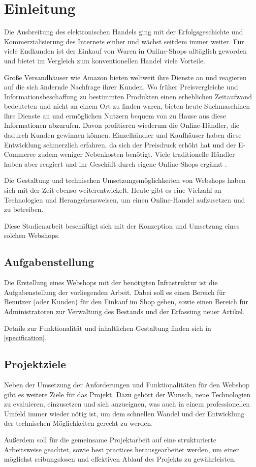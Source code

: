 \section{Einleitung} \thispagestyle{nomarkstyle}
Die Ausbreitung des elektronischen Handels ging mit der Erfolgsgeschichte und Kommerzialisierung des Internets einher und wächst seitdem immer weiter.
Für viele Endkunden ist der Einkauf von Waren in Online-Shops alltäglich geworden und bietet im Vergleich zum konventionellen Handel viele Vorteile.

Große Versandhäuser wie Amazon bieten weltweit ihre Dienste an und reagieren auf die sich ändernde Nachfrage ihrer Kunden.
Wo früher Preisvergleiche und Informationsbeschaffung zu bestimmten Produkten einen erheblichen Zeitaufwand bedeuteten und nicht an einem Ort zu finden waren, bieten heute Suchmaschinen ihre Dienste an und ermöglichen Nutzern bequem von zu Hause aus diese Informationen abzurufen.
Davon profitieren wiederum die Online-Händler, die dadurch Kunden gewinnen können.
Einzelhändler und Kaufhäuser haben diese Entwicklung schmerzlich erfahren, da sich der Preisdruck erhöht hat und der E-Commerce zudem weniger Nebenkosten benötigt.
Viele traditionelle Händler haben aber reagiert und ihr Geschäft durch eigene Online-Shops ergänzt \cite{Riehm2004}.

Die Gestaltung und technischen Umsetzungsmöglichkeiten von Webshops haben sich mit der Zeit ebenso weiterentwickelt.
Heute gibt es eine Vielzahl an Technologien und Herangehensweisen, um einen Online-Handel aufzusetzen und zu betreiben.

Diese Studienarbeit beschäftigt sich mit der Konzeption und Umsetzung eines solchen Webshops.

\subsection{Aufgabenstellung}
Die Erstellung eines Webshops mit der benötigten Infrastruktur ist die Aufgabenstellung der vorliegenden Arbeit.
Dabei soll es einen Bereich für Benutzer (oder Kunden) für den Einkauf im Shop geben, sowie einen Bereich für Administratoren zur Verwaltung des Bestands und der Erfassung neuer Artikel.

Details zur Funktionalität und inhaltlichen Gestaltung finden sich in \cref{specification}.
\subsection{Projektziele}
Neben der Umsetzung der Anforderungen und Funktionalitäten für den Webshop gibt es weitere Ziele für das Projekt.
Dazu gehört der Wunsch, neue Technologien zu evaluieren, einzusetzen und sich anzueignen, was auch in einem professionellen Umfeld immer wieder nötig ist, um dem schnellen Wandel und der Entwicklung der technischen Möglichkeiten gerecht zu werden.

Außerdem soll für die gemeinsame Projektarbeit auf eine strukturierte Arbeitsweise geachtet, sowie best practices herausgearbeitet werden, um einen möglichst reibungslosen und effektiven Ablauf des Projekts zu gewährleisten.
